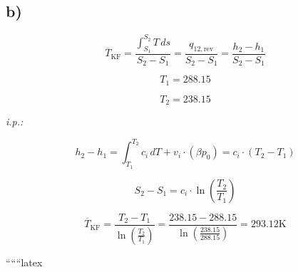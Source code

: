 

\subsection*{b)}

\[
\overline{T}_{\text{KF}} = \frac{\int_{S_1}^{S_2} T \, ds}{S_2 - S_1} = \frac{q_{12, \text{rev}}}{S_2 - S_1} = \frac{h_2 - h_1}{S_2 - S_1}
\]

\[
T_1 = 288.15
\]

\[
T_2 = 238.15
\]

\textit{i.p.:} 

\[
h_2 - h_1 = \int_{T_1}^{T_2} c_i \, dT + v_i \cdot (\beta p_0) = c_i \cdot (T_2 - T_1)
\]

\[
S_2 - S_1 = c_i \cdot \ln \left( \frac{T_2}{T_1} \right)
\]

\[
\overline{T}_{\text{KF}} = \frac{T_2 - T_1}{\ln \left( \frac{T_2}{T_1} \right)} = \frac{238.15 - 288.15}{\ln \left( \frac{238.15}{288.15} \right)} = 293.12 \text{K}
\]

``````latex